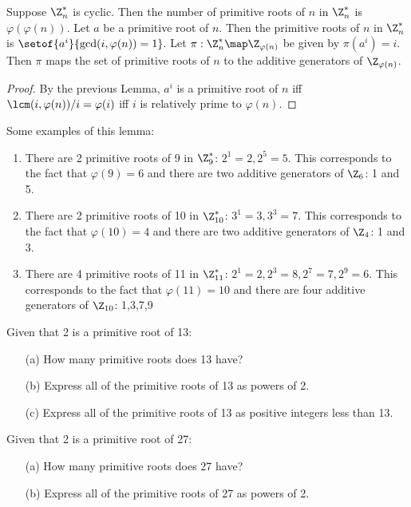 \documentclass[oneside,12pt]{amsart}
\begin{document}
\begin{corollary}
Suppose $\Z^*_n$ is cyclic. Then the number of primitive roots of $n$ in $\Z^*_n$ is $\varphi(\varphi(n))$.
Let $a$ be a primitive root of $n$. Then the primitive roots of $n$ in $\Z^*_n$ is $\setof{a^i}{\gcd(i,\varphi(n)) = 1}.$
Let $\pi:\Z^*_n\map\Z_{\varphi(n)}$ be given by $\pi(a^i) = i$. Then $\pi$ maps the set of primitive roots of $n$ to the additive generators of $\Z_{\varphi(n)}$.
\end{corollary}
\begin{proof}
By the previous Lemma, $a^i$ is a primitive root of $n$ iff $\lcm(i,\varphi(n))/i = \varphi(i)$ iff $i$ is relatively prime to $\varphi(n)$.
\end{proof}


\begin{in_class_example} Some examples of this lemma:
\begin{enumerate}
\item There are 2 primitive roots of 9 in $\Z^*_9$: $2^1=2, 2^5=5$. This corresponds to the fact that $\varphi(9)=6$ and there are two additive generators of $\Z_6$: 1 and 5.
\item There are 2 primitive roots of 10 in $\Z^*_{10}$: $3^1=3, 3^3=7$. This corresponds to the fact that $\varphi(10)=4$ and there are two additive generators of $\Z_4$: 1 and 3.
\item There are 4 primitive roots of 11 in $\Z^*_{11}$: $2^1=2, 2^3=8, 2^7=7, 2^9=6$. This corresponds to the fact that $\varphi(11)=10$ and there are four additive generators of $\Z_{10}$: 1,3,7,9
\end{enumerate}
\end{in_class_example}

\begin{homework}
Given that 2 is a primitive root of 13:
\begin{enumerate}
\item[{(a)}] How many primitive roots does 13 have?
\item[{(b)}] Express all of the primitive roots of 13 as powers of 2.
\item[{(c)}] Express all of the primitive roots of 13 as positive integers less than 13.
\end{enumerate}
\end{homework}

\begin{homework}
Given that 2 is a primitive root of 27:
\begin{enumerate}
\item[{(a)}] How many primitive roots does 27 have?
\item[{(b)}] Express all of the primitive roots of 27 as powers of 2.
\end{enumerate}
\end{homework}
\end{document}
